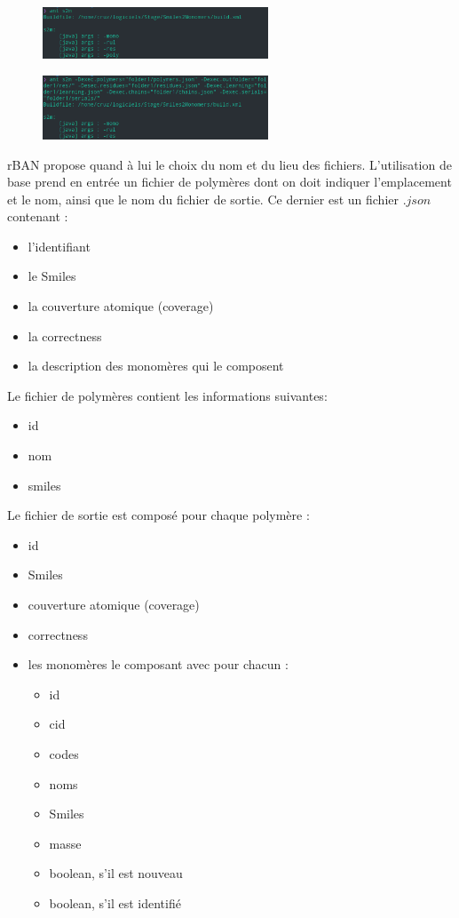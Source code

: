 \documentclass[11pt, a4paper]{report}
\begin{document}
	\begin{figure}[H]
		\captionsetup{justification=centering}
		\centering
		\includegraphics[width=0.6\textwidth]{images/ants2m.png}
	\end{figure}
	\vspace{0.000000000001cm}
	\begin{figure}[H]
		\captionsetup{justification=centering}
		\centering
		\includegraphics[width=0.6\textwidth]{images/ants2m-D.png}
	\end{figure}
	
	rBAN propose quand à lui le choix du nom et du lieu des fichiers. L'utilisation de base prend en entrée un fichier de polymères dont on doit indiquer l'emplacement et le nom, ainsi que le nom du fichier de sortie. Ce dernier est un fichier $.json$ contenant :
	\begin{itemize}
		\item l'identifiant
		\item le Smiles
		\item la couverture atomique (coverage)
		\item la correctness
		\item la description des monomères qui le composent
	\end{itemize}

	Le fichier de polymères contient les informations suivantes:
	\begin{itemize}
		\item id
		\item nom
		\item smiles
	\end{itemize}
	
	Le fichier de sortie est composé pour chaque polymère :
	\begin{itemize}
		\item id
		\item Smiles
		\item couverture atomique (coverage)
		\item correctness
		\item les monomères le composant avec pour chacun :
		\begin{itemize}
			\item id
			\item cid
			\item codes
			\item noms
			\item Smiles
			\item masse
			\item boolean, s'il est nouveau
			\item boolean, s'il est identifié
		\end{itemize}
	\end{itemize}
	
\end{document}
